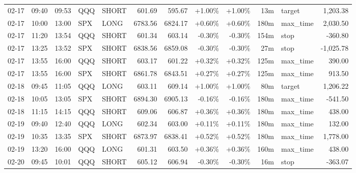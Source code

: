 \documentclass[11pt,a4paper,twoside]{article}
\begin{document}
\begin{center}
\begin{longtable}{>{\color{txtmain}}l l l l l r r r r r >{\color{txtmain}}l r}
02-17 & 09:40 & 09:53 & QQQ & SHORT & 601.69 & 595.67 & \textcolor{wingreen}{+1.00\%} & \textcolor{wingreen}{+1.00\%} & 13m & target & \textcolor{wingreen}{1,203.38} \\
02-17 & 10:00 & 13:00 & SPX & LONG & 6783.56 & 6824.17 & \textcolor{wingreen}{+0.60\%} & \textcolor{wingreen}{+0.60\%} & 180m & max\_time & \textcolor{wingreen}{2,030.50} \\
02-17 & 11:20 & 13:54 & QQQ & SHORT & 601.34 & 603.14 & \textcolor{lossred}{-0.30\%} & \textcolor{lossred}{-0.30\%} & 154m & stop & \textcolor{lossred}{-360.80} \\
02-17 & 13:25 & 13:52 & SPX & SHORT & 6838.56 & 6859.08 & \textcolor{lossred}{-0.30\%} & \textcolor{lossred}{-0.30\%} & 27m & stop & \textcolor{lossred}{-1,025.78} \\
02-17 & 13:55 & 16:00 & QQQ & SHORT & 603.17 & 601.22 & \textcolor{wingreen}{+0.32\%} & \textcolor{wingreen}{+0.32\%} & 125m & max\_time & \textcolor{wingreen}{390.00} \\
02-17 & 13:55 & 16:00 & SPX & SHORT & 6861.78 & 6843.51 & \textcolor{wingreen}{+0.27\%} & \textcolor{wingreen}{+0.27\%} & 125m & max\_time & \textcolor{wingreen}{913.50} \\
02-18 & 09:45 & 11:05 & QQQ & LONG & 603.11 & 609.14 & \textcolor{wingreen}{+1.00\%} & \textcolor{wingreen}{+1.00\%} & 80m & target & \textcolor{wingreen}{1,206.22} \\
02-18 & 10:05 & 13:05 & SPX & SHORT & 6894.30 & 6905.13 & \textcolor{lossred}{-0.16\%} & \textcolor{lossred}{-0.16\%} & 180m & max\_time & \textcolor{lossred}{-541.50} \\
02-18 & 11:15 & 14:15 & QQQ & SHORT & 609.06 & 606.87 & \textcolor{wingreen}{+0.36\%} & \textcolor{wingreen}{+0.36\%} & 180m & max\_time & \textcolor{wingreen}{438.00} \\
02-19 & 09:40 & 12:40 & QQQ & LONG & 602.34 & 603.00 & \textcolor{wingreen}{+0.11\%} & \textcolor{wingreen}{+0.11\%} & 180m & max\_time & \textcolor{wingreen}{132.00} \\
02-19 & 10:35 & 13:35 & SPX & SHORT & 6873.97 & 6838.41 & \textcolor{wingreen}{+0.52\%} & \textcolor{wingreen}{+0.52\%} & 180m & max\_time & \textcolor{wingreen}{1,778.00} \\
02-19 & 13:20 & 16:00 & QQQ & LONG & 601.31 & 603.50 & \textcolor{wingreen}{+0.36\%} & \textcolor{wingreen}{+0.36\%} & 160m & max\_time & \textcolor{wingreen}{438.00} \\
02-20 & 09:45 & 10:01 & QQQ & SHORT & 605.12 & 606.94 & \textcolor{lossred}{-0.30\%} & \textcolor{lossred}{-0.30\%} & 16m & stop & \textcolor{lossred}{-363.07} \\

\end{longtable}
\end{center}
\end{document}
